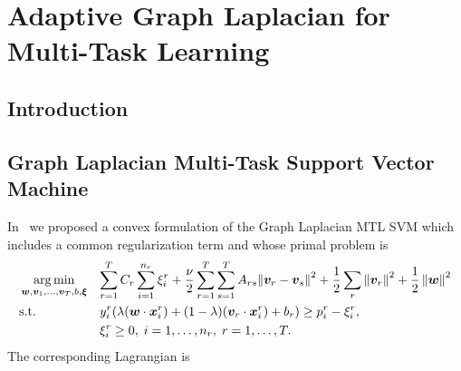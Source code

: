 
\chapter{Adaptive Graph Laplacian for Multi-Task Learning} %
\label{Chapter5}

{\bf \small{

}}

\section{Introduction}

\section{Graph Laplacian Multi-Task Support Vector Machine}
In~\cite{RuizAD20} we proposed a convex formulation of the Graph Laplacian MTL SVM which includes a common regularization term and whose primal problem is
%
\begin{equation}\label{eq:primal_cvx-graphLap}
  \begin{aligned}
  & \argmin_{\myvec{w}, \myvec{v}_1, \ldots, \myvec{v}_T, b , \myvec{\xi}}
  & & { \sum_{r=1}^T C_r \sum_{i=1}^{n_r} {\xi_i^r}  + \frac{\nu}{2} \sum_{r=1}^T \sum_{s=1}^T A_{rs} {\| \myvec{v}_r - \myvec{v}_s \|}^2 + \frac{1}{2} \sum_r \norm{\myvec{v}_r}^2 + \frac{1}{2} \norm{\myvec{w}}^2} \\
  & \text{s.t.}
  & & y_i^r (\lambda (\myvec{w} \cdot \myvec{x}_i^r) + (1 - \lambda) (\myvec{v}_r \cdot \myvec{x}_i^r) + b_r) \geq p_i^r - \xi_i^r  ,\\
  & & & \xi_i^r \geq 0,  \;  i = 1, \dotsc, n_r, \; r=1, \dotsc, T .
  \end{aligned}
\end{equation}
%
The corresponding Lagrangian is
